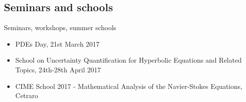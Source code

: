 \documentclass{beamer}
\begin{document}
\subsection{Seminars and schools}

\begin{frame}{Seminars, workshops, summer schools}

  \begin{itemize}
  \item
    PDEs Day, 21st March 2017
  \item
    School on Uncertainty Quantification for Hyperbolic Equations and Related Topics, 24th-28th April 2017
  \item
    CIME School 2017  - Mathematical Analysis of the Navier-Stokes Equations, Cetraro
  \end{itemize}
\end{frame}
\end{document}
